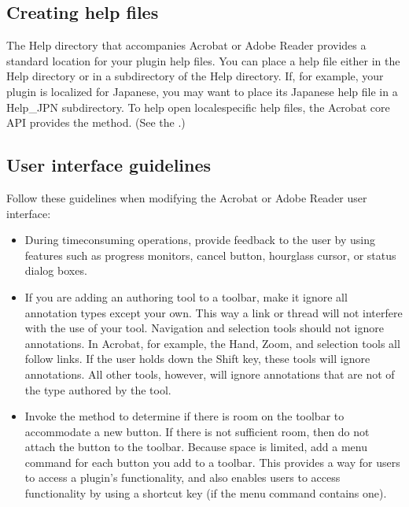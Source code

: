 \documentclass[letterpaper,12pt,english,openany,oneside]{sphinxmanual}
\begin{document}
\subsection{Creating help files}
\label{\detokenize{Plugins_Pimech:creating-help-files}}
The Help directory that accompanies Acrobat or Adobe Reader provides a standard location for your plug\sphinxhyphen{}in help files. You can place a help file either in the Help directory or in a subdirectory of the Help directory. If, for example, your plugin is localized for Japanese, you may want to place its Japanese help file in a Help\_JPN subdirectory. To help open locale\sphinxhyphen{}specific help files, the Acrobat core API provides the  method. (See the .)


\subsection{User interface guidelines}
\label{\detokenize{Plugins_Pimech:user-interface-guidelines}}
Follow these guidelines when modifying the Acrobat or Adobe Reader user interface:
\begin{itemize}
\item {} 
During time\sphinxhyphen{}consuming operations, provide feedback to the user by using features such as progress monitors, cancel button, hourglass cursor, or status dialog boxes.

\item {} 
If you are adding an authoring tool to a toolbar, make it ignore all annotation types except your own. This way a link or thread will not interfere with the use of your tool. Navigation and selection tools should not ignore annotations. In Acrobat, for example, the Hand, Zoom, and selection tools all follow links. If the user holds down the Shift key, these tools will ignore annotations. All other tools, however, will ignore annotations that are not of the type authored by the tool.

\item {} 
Invoke the  method to determine if there is room on the toolbar to accommodate a new button. If there is not sufficient room, then do not attach the button to the toolbar. Because space is limited, add a menu command for each button you add to a toolbar. This provides a way for users to access a plugin’s functionality, and also enables users to access functionality by using a shortcut key (if the menu command contains one).

\end{itemize}
\end{document}
